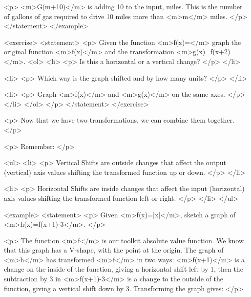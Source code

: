                 <p>
                    <m>G(m+10)</m> is adding 10 to the input, miles. This is the number of gallons of gas required to drive 10 miles more than <m>m</m> miles.
                </p>
            </statement>
        </example>

        <exercise>
            <statement>
                <p>
                    Given the function <m>f(x)=</m> graph the original function <m>f(x)</m> and the transformation <m>g(x)=f(x+2)</m>.
                    <ol>
                        <li>
                            <p>
                                Is this a horizontal or a vertical change?
                            </p>
                        </li>

                        <li>
                            <p>
                                Which way is the graph shifted and by how many units?
                            </p>
                        </li>

                        <li>
                            <p>
                                Graph <m>f(x)</m> and <m>g(x)</m> on the same axes.
                            </p>
                        </li>
                    </ol>
                </p>
            </statement>
        </exercise>

        <p>
            Now that we have two transformations, we can combine them together.
        </p>

        <p>
            Remember:
        </p>

        <ul>
            <li>
                <p>
                    Vertical Shifts are outside changes that affect the output (vertical) axis values shifting the transformed function up or down.
                </p>
            </li>

            <li>
                <p>
                    Horizontal Shifts are inside changes that affect the input (horizontal) axis values shifting the transformed function left or right.
                </p>
            </li>
        </ul>

        <example>
            <statement>
                <p>
                    Given <m>f(x)=|x|</m>, sketch a graph of <m>h(x)=f(x+1)-3</m>.
                </p>

                <p>
                    The function <m>f</m> is our toolkit absolute value function.
                    We know that this graph has a V-shape, with the point at the origin.
                    The graph of <m>h</m> has transformed <m>f</m> in two ways: <m>f(x+1)</m> is a change on the inside of the function, giving a horizontal shift left by 1, then the subtraction by 3 in <m>f(x+1)-3</m> is a change to the outside of the function, giving a vertical shift down by 3.
                    Transforming the graph gives:
                </p>

